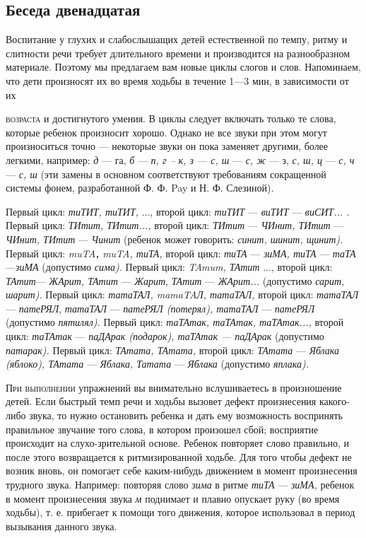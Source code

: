 \documentclass{book}
\renewcommand{\emph}[1]{\textit{#1}}
\begin{document}
\subsection*{Беседа двенадцатая}

Воспитание у глухих и слабослышащих детей естественной по темпу, ритму и
слитности речи требует длительного времени и производится на
разнообразном материале. Поэтому мы предлагаем вам новые циклы слогов и
слов. Напоминаем, что дети произносят их во время ходьбы в течение 1---3
мин, в зависимости от их

\textsc{возраста} и достигнутого умения. В циклы следует включать только
те слова, которые ребенок произносит хорошо. Однако не все звуки при
этом могут произноситься точно --- некоторые звуки он пока заменяет
другими, более легкими, например: \emph{д} --- га, \emph{б} --- \emph{п,
г -- к, з --- с, ш} --- \emph{с, ж} --- з, \emph{с, ш, ц} --- \emph{с,
ч} --- \emph{с, ш} (эти замены в основном соответствуют требованиям
сокращенной системы фонем, разработанной Ф. Ф. Pay и Н. Ф. Слезиной).

Первый цикл: \emph{тиТИТ, тиТИТ,} ..., второй цикл: \emph{тиТИТ} ---
\emph{виТИТ} --- \emph{виСИТ... .} Первый цикл: \emph{ТИтит, ТИтит...,}
второй цикл: \emph{ТИтит} --- \emph{ЧИнит, ТИтит} --- \emph{ЧИнит,
ТИтит} --- \emph{Чинит} (ребенок может говорить: \emph{синит, шинит,
щинит).} Первый цикл: \emph{muTA\textbf{,} muTA, тиТА,} второй цикл:
\emph{тиТА} --- \emph{зиМА, тиТА} --- \emph{таТА}---\emph{зиМА}
(допустимо \emph{сима).} Первый цикл: \emph{TAmum, ТАтит} ..., второй
цикл: \emph{ТАтит}--- \emph{ЖАрит, ТАтит} --- \emph{Жарит}, \emph{ТАтит}
--- \emph{ЖАрит...} (допустимо \emph{сарит, шарит).} Первый цикл:
\emph{татаТАЛ, mamaTAЛ, татаТАЛ,} второй цикл: \emph{татаТАЛ} ---
\emph{патеРЯЛ}, \emph{татаТАЛ} --- \emph{патеРЯЛ (потерял), татаТАЛ} ---
\emph{патеРЯЛ} (допустимо \emph{пятилял).} Первый цикл: \emph{таТАтак,
таТАтак, таТАтак...,} второй цикл: \emph{таТАтак} --- \emph{паДАрак
(подарок), таТАтак --- паДАрак} (допустимо \emph{патарак).} Первый цикл:
\emph{ТАтата, ТАтата,} второй цикл: \emph{ТАтата} --- \emph{Яблака
(яблоко), ТАтата} --- \emph{Яблака, Татата} --- \emph{Яблака} (допустимо
\emph{яплака).}

\textsc{При выполнении} упражнений вы внимательно вслушиваетесь в
произношение детей. Если быстрый темп речи и ходьбы вызовет дефект
произнесения какого-либо звука, то нужно остановить ребенка и дать ему
возможность воспринять правильное звучание того слова, в котором
произошел сбой; восприятие происходит на слухо-зрительной основе.
Ребенок повторяет слово правильно, и после этого возвращается к
ритмизированной ходьбе. Для того чтобы дефект не возник вновь, он
помогает себе каким-нибудь движением в момент произнесения трудного
звука. Например: повторяя слово \emph{зима} в ритме \emph{тиТА} ---
\emph{зиМА,} ребенок в момент произнесения звука \emph{м} поднимает и
плавно опускает руку (во время ходьбы), т. е. прибегает к помощи того
движения, которое использовал в период вызывания данного звука.
\end{document}
